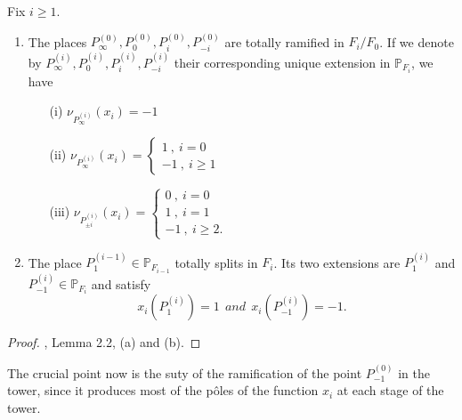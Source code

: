 \documentclass[10pt]{article}
\begin{document}
\begin{corollary} Fix $i\geq 1$.
\begin{enumerate}
\item The places $P_{\infty}^{(0)},P_{0}^{(0)},P_{i}^{(0)},P_{-i}^{(0)}$ are totally ramified in $F_i/F_0$. If we denote by $P_{\infty}^{(i)},P_{0}^{(i)},P_{i}^{(i)},P_{-i}^{(i)}$ their corresponding unique extension in $\mathbb{P}_{F_i}$, we have
\begin{itemize}
\item[(i)] $\nu_{P_{\infty}^{(i)}}(x_i)=-1$
\item[(ii)] $\nu_{P_{\infty}^{(i)}}(x_i) = \left\{ \begin{array}{ll}
1 \ , \ i=0 \\
-1 \ , \ i \geq 1
\end{array} 
\right.$
\item[(iii)] $\nu_{P_{\pm i}^{(i)}}(x_i) = \left\{ \begin{array}{lll}
0 \ , \ i=0 \\
1 \ , \ i = 1 \\
-1 \ , \ i \geq 2.
\end{array} 
\right.$
\end{itemize}
\item The place $P_1^{(i-1)} \in \mathbb{P}_{F_{i-1}}$ totally splits in $F_{i}$. Its two extensions are $P_1^{(i)}$ and $P_{-1}^{(i)} \in \mathbb{P}_{F_{i}}$ and satisfy
\[x_{i}(P_1^{(i)}) = 1 \ \ and  \ \ x_{i}(P_{-1}^{(i)}) = -1.\] 
\end{enumerate}
\end{corollary}

\begin{proof}
\cite{NOQ}, Lemma 2.2, (a) and (b).
\end{proof}

\s

The crucial point now is the suty of the ramification of the point $P_{-1}^{(0)}$ in the tower, since it produces most of the pôles of the function $x_i$ at each stage of the tower.

\s
\end{document}
